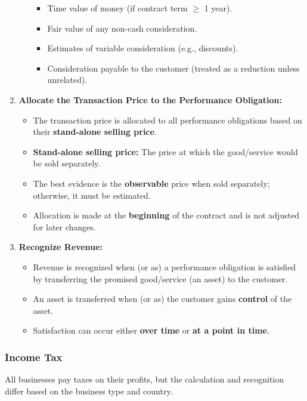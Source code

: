 \begin{enumerate}
\begin{itemize}
        \begin{itemize}
            \item Time value of money (if contract term $\ge$ 1 year).
            \item Fair value of any non-cash consideration.
            \item Estimates of variable consideration (e.g., discounts).
            \item Consideration payable to the customer (treated as a reduction unless unrelated).
        \end{itemize}
    \end{itemize}
    \item \textbf{Allocate the Transaction Price to the Performance Obligation:}
    \begin{itemize}
        \item The transaction price is allocated to all performance obligations based on their \textbf{stand-alone selling price}.
        \item \textbf{Stand-alone selling price:} The price at which the good/service would be sold separately.
        \item The best evidence is the \textbf{observable} price when sold separately; otherwise, it must be estimated.
        \item Allocation is made at the \textbf{beginning} of the contract and is not adjusted for later changes.
    \end{itemize}
    \item \textbf{Recognize Revenue:}
    \begin{itemize}
        \item Revenue is recognized when (or as) a performance obligation is satisfied by transferring the promised good/service (an asset) to the customer.
        \item An asset is transferred when (or as) the customer gains \textbf{control} of the asset.
        \item Satisfaction can occur either \textbf{over time} or \textbf{at a point in time}.
    \end{itemize}
\end{enumerate}

\subsubsection{Income Tax}

All businesses pay taxes on their profits, but the calculation and recognition differ based on the business type and country.

